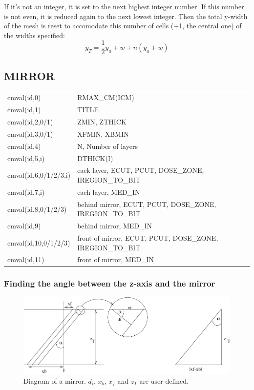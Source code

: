 \documentclass[12pt]{book}
\begin{document}
If it's not an integer, it is set to the next highest integer number.  If
this number is not even, it is reduced again to the next lowest
integer.  Then the total y-width of the mesh is reset to accomodate this
number of cells (+1, the central one) of the widths specified:
$$y_T=\frac{1}{2}y_a+w+n(y_a+w)$$

\subsection{MIRROR}

\begin{tabular}{|p{4.5cm}|p{11.5cm}|}\hline
cmval(id,0) &  RMAX\_CM(ICM) \\
cmval(id,1) &  TITLE \\
cmval(id,2,0/1) &  ZMIN, ZTHICK \\
cmval(id,3,0/1) &  XFMIN, XBMIN \\
cmval(id,4) &  N, Number of layers  \\
cmval(id,5,i) &  DTHICK(I) \\
cmval(id,6,0/1/2/3,i) & eack layer, ECUT, PCUT, DOSE\_ZONE, IREGION\_TO\_BIT \\
cmval(id,7,i) & each layer, MED\_IN \\
cmval(id,8,0/1/2/3) & behind mirror, ECUT, PCUT, DOSE\_ZONE, IREGION\_TO\_BIT\\
cmval(id,9) & behind mirror, MED\_IN \\
cmval(id,10,0/1/2/3) & front of mirror, ECUT, PCUT, DOSE\_ZONE, IREGION\_TO\_BIT\\
cmval(id,11) & front of mirror, MED\_IN \\\hline
\end{tabular}

\subsubsection{Finding the angle between the z-axis and the mirror}
\begin{figure}[htbp]
\vspace{1.8in}
\includegraphics{figures/mirrorfig}
\caption{Diagram of a mirror.  $d_i$, $x_b$, $x_f$ and $z_T$ are user-defined.
\label{mirrorfig}}
\end{figure}
\end{document}
